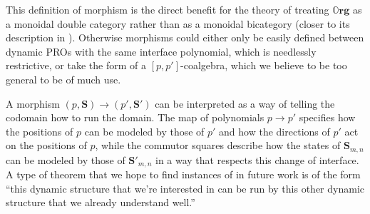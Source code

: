 \documentclass[11pt, one side, article]{memoir}
\theoremstyle{definition}
\theoremstyle{plain}
\newcommand{\Cat}[1]{\mathbf{#1}}%
\newcommand{\0}{\textsf{0}}
\newcommand{\1}{\tn{\textsf{1}}}
\newcommand{\org}{{\mathbb{O}\Cat{rg}}}
\renewcommand{\S}{{\Cat{S}}}
\begin{document}
This definition of morphism is the direct benefit for the theory of treating $\org$ as a monoidal double category rather than as a monoidal bicategory (closer to its description in \cite{spivak2021learners}). Otherwise morphisms could either only be easily defined between dynamic PROs with the same interface polynomial, which is needlessly restrictive, or take the form of a $[p,p']$-coalgebra, which we believe to be too general to be of much use.

A morphism $(p,\S) \to (p',\S')$ can be interpreted as a way of telling the codomain how to run the domain. The map of polynomials $p \to p'$ specifies how the positions of $p$ can be modeled by those of $p'$ and how the directions of $p'$ act on the positions of $p$, while the commutor squares describe how the states of $\S_{m,n}$ can be modeled by those of $\S'_{m,n}$ in a way that respects this change of interface. A type of theorem that we hope to find instances of in future work is of the form ``this dynamic structure that we're interested in can be run by this other dynamic structure that we already understand well.''
\end{document}
